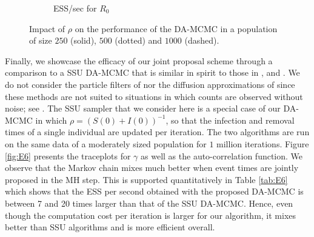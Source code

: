 \documentclass[12pt]{article}
\begin{document}
\begin{figure}
\begin{center}
\begin{subfigure}[b]{0.32\textwidth}
				\caption{ESS/sec for $R_0$
				}
				\label{fig:E3_facet_ESSsecR0}
			\end{subfigure}
		\end{center}
		\caption{Impact of $\rho$ on the performance of the DA-MCMC in a population of size $250$ (solid), $500$ (dotted) and $1000$ (dashed).
			\label{fig:E3}}
	\end{figure}
	
	Finally, we showcase the efficacy of our joint proposal scheme through a comparison %
	to a SSU DA-MCMC that is similar in spirit to those in \cite{Gibson.1998}, \cite{ONeill.1999} and \cite{Fintzi.2017}. We do not consider the particle filters of \cite{King.2015} nor the diffusion approximations of \cite{Fintzi.2020} since these methods are not suited to situations in which counts are observed without noise; see \cite{Ho.2018}.
	The SSU sampler that we consider here is a special case of our DA-MCMC in which $\rho = (S(0)+I(0))^{-1}$, so that the infection and removal times of a single individual are updated per iteration. The two algorithms are run on the same data of a moderately sized population for $1$ million iterations. Figure \ref{fig:E6} presents the traceplots for $\gamma$ as well as the auto-correlation function. We observe that the Markov chain mixes much better when event times are jointly proposed in the MH step. This is supported quantitatively in Table \ref{tab:E6} which shows that the ESS per second obtained with the proposed DA-MCMC is between 7 and 20 times larger than that of the SSU DA-MCMC. Hence, even though the computation cost per iteration is larger for our algorithm, it mixes better than SSU algorithms and is more efficient overall.
	
\end{document}
